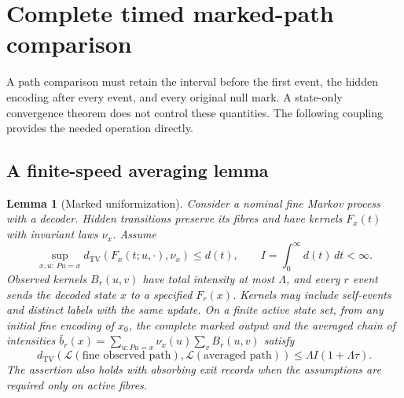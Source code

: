 \documentclass[11pt,reqno]{amsart}
\newtheorem{lemma}[theorem]{Lemma}
\theoremstyle{definition}
\theoremstyle{remark}
\newcommand{\TV}{d_{\mathrm{TV}}}
\newcommand{\Law}{\mathcal L}
\begin{document}
\section{Complete timed marked-path comparison}\label{sec:path}
A path comparison must retain the interval before the first event, the hidden
encoding after every event, and every original null mark. A state-only
convergence theorem does not control these quantities. The following coupling
provides the needed operation directly.

\subsection{A finite-speed averaging lemma}
\begin{lemma}[Marked uniformization]\label{lem:uniformization}
Consider a nominal fine Markov process with a decoder. Hidden transitions
preserve its fibres and have kernels $F_x(t)$ with invariant laws $\nu_x$.
Assume
\[
 \sup_{x,u:\,Pu=x}\TV(F_x(t;u,\cdot),\nu_x)\le d(t),
 \qquad I=\int_0^\infty d(t)\,dt<\infty.
\]
Observed kernels $B_r(u,v)$ have total intensity at most $\Lambda$, and every
$r$ event sends the decoded state $x$ to a specified $F_r(x)$. Kernels may
include self-events and distinct labels with the same update. On a finite
active state set, from any initial fine encoding of $x_0$, the complete marked
output and the averaged chain of intensities
$\bar b_r(x)=\sum_{u:Pu=x}\nu_x(u)\sum_v B_r(u,v)$ satisfy
\begin{equation}\label{eq:uniformization}
 \TV(\Law(\text{fine observed path}),\Law(\text{averaged path}))
 \le\Lambda I(1+\Lambda\tau).
\end{equation}
The assertion also holds with absorbing exit records when the assumptions are
required only on active fibres.
\end{lemma}
\end{document}
